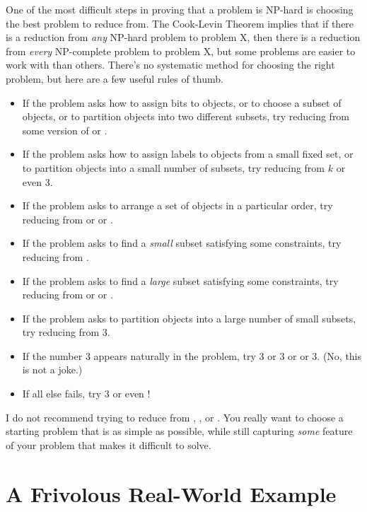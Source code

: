 One of the most difficult steps in proving that a problem is NP-hard is choosing the best problem to reduce from.
The Cook-Levin Theorem implies that if there is a reduction from \textit{any} NP-hard problem to problem X, then there is a reduction from \textit{every} NP-complete problem to problem X, but some problems are easier to work with than others.
There’s no systematic method for choosing the right problem, but here are a few useful rules of thumb.
\begin{itemize}
\item If the problem asks how to assign bits to objects, or to choose a subset of objects, or to partition objects into two different subsets, try reducing from some version of  or .
\item If the problem asks how to assign labels to objects from a small fixed set, or to partition objects into a small number of subsets, try reducing from $k$ or even 3.
\item If the problem asks to arrange a set of objects in a particular order, try reducing from  or  or .
\item If the problem asks to find a \textit{small} subset satisfying some constraints, try reducing from .
\item If the problem asks to find a \textit{large} subset satisfying some constraints, try reducing from  or  or .
\item If the problem asks to partition objects into a large number of small subsets, try reducing from 3.
\item If the number $3$ appears naturally in the problem, try 3 or 3 or  or 3.
(No, this is not a joke.)
\item If all else fails, try 3 or even !
\end{itemize}
I do not recommend trying to reduce from , , or .
You really want to choose a starting problem that is as simple as possible, while still capturing \textit{some} feature of your problem that makes it difficult to solve.

\section{A Frivolous Real-World Example}
\label{sec:12.15}

